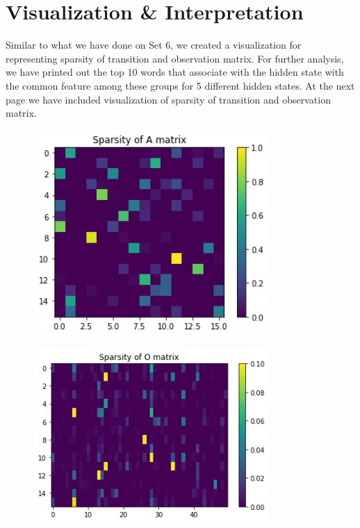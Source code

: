 \documentclass{article}
\begin{document}
\newpage

\section{Visualization \& Interpretation}
Similar to what we have done on Set 6, we created a visualization for representing sparsity of transition and observation matrix. For further analysis, we have printed out the top 10 words that associate with the hidden state with the common feature among these groups for 5 different hidden states. At the next page we have included visualization of sparsity of transition and observation matrix. 

\begin{figure}[htp]
        \centering
        \includegraphics[width=0.8\textwidth]{transition.png}
        \label{fig:figure1}

        \centering
        \includegraphics[width=0.8\textwidth]{observation.png}
        \label{fig:figure1}
\end{figure}
\end{document}
